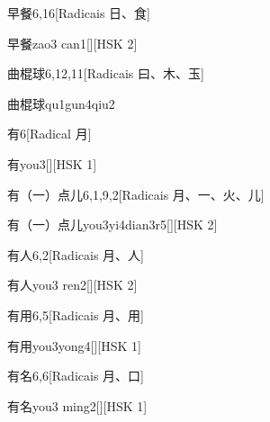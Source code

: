 \begin{entry}{早餐}{6,16}[Radicais ⽇、⾷]
  \begin{phonetics}{早餐}{zao3 can1}[][HSK 2]
  \end{phonetics}
\end{entry}

\begin{entry}{曲棍球}{6,12,11}[Radicais ⽈、⽊、⽟]
  \begin{phonetics}{曲棍球}{qu1gun4qiu2}
  \end{phonetics}
\end{entry}

\begin{entry}{有}{6}[Radical ⽉]
  \begin{phonetics}{有}{you3}[][HSK 1]
  \end{phonetics}
\end{entry}

\begin{entry}{有（一）点儿}{6,1,9,2}[Radicais ⽉、⼀、⽕、⼉]
  \begin{phonetics}{有（一）点儿}{you3yi4dian3r5}[][HSK 2]
  \end{phonetics}
\end{entry}

\begin{entry}{有人}{6,2}[Radicais ⽉、⼈]
  \begin{phonetics}{有人}{you3 ren2}[][HSK 2]
  \end{phonetics}
\end{entry}

\begin{entry}{有用}{6,5}[Radicais ⽉、⽤]
  \begin{phonetics}{有用}{you3yong4}[][HSK 1]
  \end{phonetics}
\end{entry}

\begin{entry}{有名}{6,6}[Radicais ⽉、⼝]
  \begin{phonetics}{有名}{you3 ming2}[][HSK 1]
  \end{phonetics}
\end{entry}

